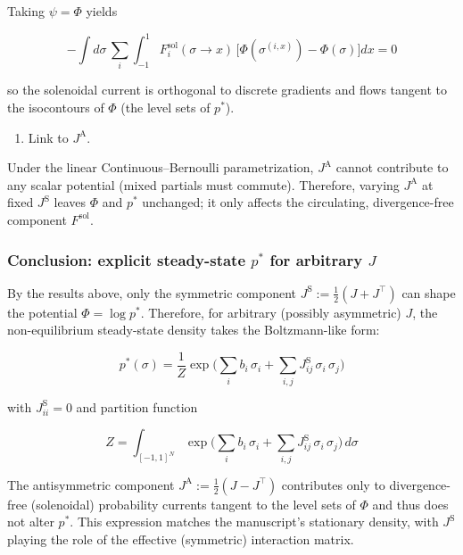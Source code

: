 \documentclass{article}
\begin{document}
Taking $\psi=\Phi$ yields

\begin{equation}
-\int d\sigma\, \sum_i\int_{-1}^1 F_i^{\mathrm{sol}}(\sigma\to x)\,\big[\Phi(\sigma^{(i,x)})-\Phi(\sigma)\big] dx = 0
\end{equation}

so the solenoidal current is orthogonal to discrete gradients and flows tangent to the isocontours of $\Phi$ (the level sets of $p^\ast$).

\begin{enumerate}[resume]
\item Link to $J^{\mathrm{A}}$.
\end{enumerate}

Under the linear Continuous--Bernoulli parametrization, $J^{\mathrm{A}}$ cannot contribute to any scalar potential (mixed partials must commute). Therefore, varying $J^{\mathrm{A}}$ at fixed $J^{\mathrm{S}}$ leaves $\Phi$ and $p^\ast$ unchanged; it only affects the circulating, divergence-free component $F^{\mathrm{sol}}$.

\subsubsection{Conclusion: explicit steady-state $p^\ast$ for arbitrary $J$}

By the results above, only the symmetric component $J^{\mathrm{S}} := \tfrac12(J+J^\top)$ can shape the potential $\Phi=\log p^\ast$. Therefore, for arbitrary (possibly asymmetric) $J$, the non-equilibrium steady-state density takes the Boltzmann-like form:

\begin{equation}
p^\ast(\sigma) = \frac{1}{Z} \exp\Bigg( \sum_i b_i\,\sigma_i + \sum_{i,j} J^{\mathrm{S}}_{ij}\,\sigma_i\,\sigma_j \Bigg)
\end{equation}

with $J^{\mathrm{S}}_{ii}=0$ and partition function

\begin{equation}
Z = \int_{[-1,1]^N} \exp\Bigg( \sum_i b_i\,\sigma_i + \sum_{i,j} J^{\mathrm{S}}_{ij}\,\sigma_i\,\sigma_j \Bigg) \, d\sigma
\end{equation}

The antisymmetric component $J^{\mathrm{A}} := \tfrac12(J -J^\top)$ contributes only to divergence-free (solenoidal) probability currents tangent to the level sets of $\Phi$ and thus does not alter $p^\ast$. This expression matches the manuscript's stationary density, with $J^{\mathrm{S}}$ playing the role of the effective (symmetric) interaction matrix.
\end{document}
